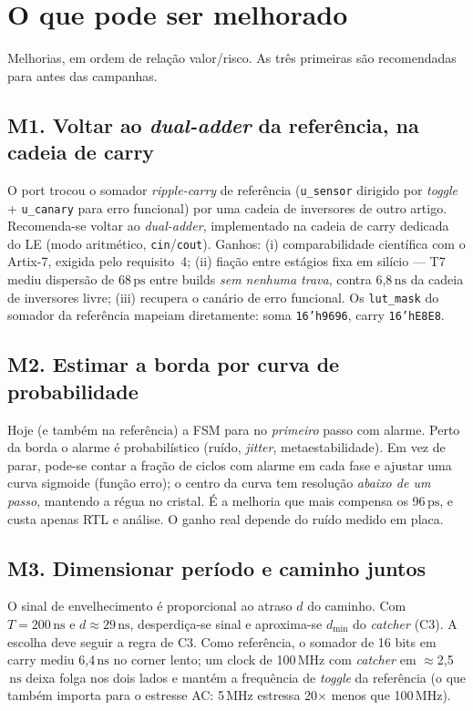\documentclass[11pt,a4paper]{article}
\newcommand{\ps}{\ensuremath{\,\mathrm{ps}}\xspace}
\newcommand{\ns}{\ensuremath{\,\mathrm{ns}}\xspace}
\newcommand{\MHz}{\ensuremath{\,\mathrm{MHz}}\xspace}
\begin{document}
\section{O que pode ser melhorado}
\label{sec:melhorias}

Melhorias, em ordem de relação valor/risco. As três primeiras são recomendadas para antes das
campanhas.

\subsection{M1. Voltar ao \emph{dual-adder} da referência, na cadeia de carry}
O port trocou o somador \emph{ripple-carry} de referência (\texttt{u\_sensor} dirigido por
\emph{toggle} + \texttt{u\_canary} para erro funcional) por uma cadeia de inversores de outro
artigo. Recomenda-se voltar ao \emph{dual-adder}, implementado na cadeia de carry dedicada do LE
(modo aritmético, \texttt{cin}/\texttt{cout}). Ganhos: (i) comparabilidade científica com o
Artix-7, exigida pelo requisito~4; (ii) fiação entre estágios fixa em silício --- T7 mediu
dispersão de 68\ps entre builds \emph{sem nenhuma trava}, contra 6{,}8\ns da cadeia de
inversores livre; (iii) recupera o canário de erro funcional. Os \texttt{lut\_mask} do
somador da referência mapeiam diretamente: soma \texttt{16'h9696}, carry \texttt{16'hE8E8}.

\subsection{M2. Estimar a borda por curva de probabilidade}
Hoje (e também na referência) a FSM para no \emph{primeiro} passo com alarme. Perto da borda o
alarme é probabilístico (ruído, \emph{jitter}, metaestabilidade). Em vez de parar, pode-se contar
a fração de ciclos com alarme em cada fase e ajustar uma curva sigmoide (função erro); o centro
da curva tem resolução \emph{abaixo de um passo}, mantendo a régua no cristal. É a melhoria que
mais compensa os 96\ps, e custa apenas RTL e análise. O ganho real depende do ruído medido em placa.

\subsection{M3. Dimensionar período e caminho juntos}
O sinal de envelhecimento é proporcional ao atraso $d$ do caminho. Com $T = 200\ns$ e
$d \approx 29\ns$, desperdiça-se sinal e aproxima-se $d_\text{min}$ do \emph{catcher} (C3). A
escolha deve seguir a regra de C3. Como referência, o somador de 16 bits em carry mediu
6{,}4\ns no corner lento; um clock de 100\MHz com \emph{catcher} em $\approx$2{,}5\ns deixa folga
nos dois lados e mantém a frequência de \emph{toggle} da referência (o que também importa para o
estresse AC: 5\MHz estressa 20$\times$ menos que 100\MHz).
\end{document}
